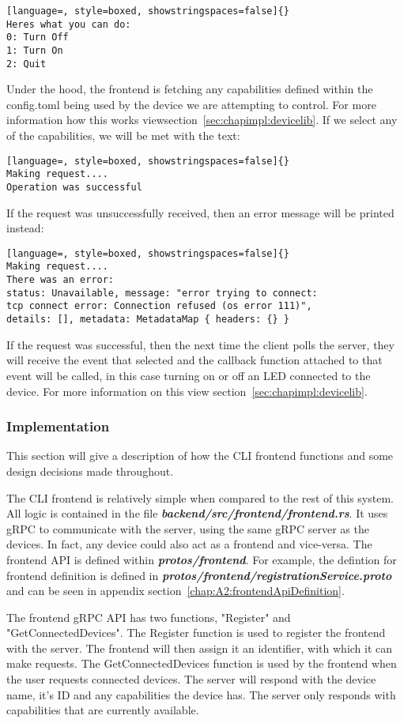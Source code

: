 \begin{lstlisting}[language=, style=boxed, showstringspaces=false]{}
Heres what you can do:
0: Turn Off
1: Turn On
2: Quit
\end{lstlisting}
Under the hood, the frontend is fetching any capabilities defined within the config.toml being used by the device we are attempting to control. For more information how this works viewsection~\ref{sec:chapimpl:devicelib}. If we select any of the capabilities, we will be met with the text:
\begin{lstlisting}[language=, style=boxed, showstringspaces=false]{}
Making request....
Operation was successful
\end{lstlisting}
If the request was unsuccessfully received, then an error message will be printed instead:
\begin{lstlisting}[language=, style=boxed, showstringspaces=false]{}
Making request....
There was an error:
status: Unavailable, message: "error trying to connect: 
tcp connect error: Connection refused (os error 111)", 
details: [], metadata: MetadataMap { headers: {} }
\end{lstlisting}
If the request was successful, then the next time the client polls the server, they will receive the event that selected and the callback function attached to that event will be called, in this case turning on or off an LED connected to the device. For more information on this view section~\ref{sec:chapimpl:devicelib}.

\subsubsection{Implementation}
This section will give a description of how the CLI frontend functions and some design decisions made throughout. 

The CLI frontend is relatively simple when compared to the rest of this system. All logic is contained in the file \textit{\textbf{backend/src/frontend/frontend.rs}}. It uses gRPC to communicate with the server, using the same gRPC server as the devices. In fact, any device could also act as a frontend and vice-versa. The frontend API is defined within \textit{\textbf{protos/frontend}}. For example, the defintion for frontend definition is defined in \textit{\textbf{protos/frontend/registrationService.proto}} and can be seen in appendix section~\ref{chap:A2:frontendApiDefinition}. 

The frontend gRPC API has two functions, "Register" and "GetConnectedDevices". The Register function is used to register the frontend with the server. The frontend will then assign it an identifier, with which it can make requests. The GetConnectedDevices function is used by the frontend when the user requests connected devices. The server will respond with the device name, it's ID and any capabilities the device has. The server only responds with capabilities that are currently available.

